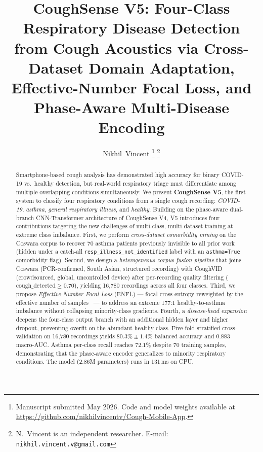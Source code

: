 \documentclass[journal]{IEEEtran}
\begin{document}
\title{CoughSense V5: Four-Class Respiratory Disease Detection
from Cough Acoustics via Cross-Dataset Domain Adaptation,
Effective-Number Focal Loss, and Phase-Aware Multi-Disease Encoding}

\author{Nikhil~Vincent%
\thanks{Manuscript submitted May 2026. Code and model weights available at
\url{https://github.com/nikhilvincentv/Cough-Mobile-App}.}%
\thanks{N.~Vincent is an independent researcher. E-mail:
\texttt{nikhil.vincent.v@gmail.com}}}

\maketitle

\begin{abstract}
Smartphone-based cough analysis has demonstrated high accuracy for
binary COVID-19 vs.\ healthy detection, but real-world respiratory
triage must differentiate among multiple overlapping conditions
simultaneously. We present \textbf{CoughSense V5}, the first system
to classify four respiratory conditions from a single cough recording:
\emph{COVID-19}, \emph{asthma}, \emph{general respiratory illness},
and \emph{healthy}. Building on the phase-aware dual-branch CNN-Transformer
architecture of CoughSense V4, V5 introduces four contributions targeting
the new challenges of multi-class, multi-dataset training at extreme class
imbalance. First, we perform \emph{cross-dataset comorbidity mining}
on the Coswara corpus to recover 70 asthma patients previously
invisible to all prior work (hidden under a catch-all
\texttt{resp\_illness\_not\_identified} label with an
\texttt{asthma=True} comorbidity flag). Second, we design a
\emph{heterogeneous corpus fusion pipeline} that joins Coswara
(PCR-confirmed, South Asian, structured recording) with CoughVID
(crowdsourced, global, uncontrolled device) after per-recording
quality filtering ($\text{cough\_detected} \ge 0.70$), yielding
16,780 recordings across all four classes. Third, we propose
\emph{Effective-Number Focal Loss} (ENFL) — focal cross-entropy
reweighted by the effective number of samples~\cite{effectivenum} —
to address an extreme 177:1 healthy-to-asthma imbalance without
collapsing minority-class gradients. Fourth, a
\emph{disease-head expansion} deepens the four-class output branch
with an additional hidden layer and higher dropout, preventing
overfit on the abundant healthy class. Five-fold stratified
cross-validation on 16,780 recordings yields
$\mathbf{80.3\%\pm1.4\%}$ balanced accuracy and
$\mathbf{0.883}$ macro-AUC.
Asthma per-class recall reaches $\mathbf{72.1\%}$ despite 70 training
samples, demonstrating that the phase-aware encoder generalizes to
minority respiratory conditions. The model (2.86M parameters) runs
in 131\,ms on CPU.
\end{abstract}
\end{document}
